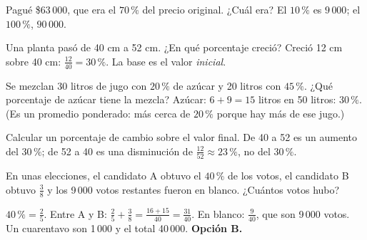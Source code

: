 \begin{ejemplo}
Pagué \$63\,000, que era el $70\,\%$ del precio original. ¿Cuál era?
\solucion El $10\,\%$ es $9\,000$; el $100\,\%$, $90\,000$.
\end{ejemplo}

\begin{ejemplo}
Una planta pasó de 40 cm a 52 cm. ¿En qué porcentaje creció?
\solucion Creció 12 cm sobre 40 cm: $\tfrac{12}{40} = 30\,\%$. La base es el valor \emph{inicial}.
\end{ejemplo}

\begin{ejemplo}
Se mezclan 30 litros de jugo con $20\,\%$ de azúcar y 20 litros con $45\,\%$. ¿Qué porcentaje de azúcar tiene la
mezcla?
\solucion Azúcar: $6 + 9 = 15$ litros en 50 litros: $30\,\%$. (Es un promedio ponderado: más cerca de $20\,\%$ porque
hay más de ese jugo.)
\end{ejemplo}

\begin{trampa}
Calcular un porcentaje de cambio sobre el valor final. De 40 a 52 es un aumento del $30\,\%$; de 52 a 40 es una
disminución de $\tfrac{12}{52} \approx 23\,\%$, no del $30\,\%$.
\end{trampa}

\begin{reto}
En unas elecciones, el candidato A obtuvo el $40\,\%$ de los votos, el candidato B obtuvo $\tfrac38$ y los 9\,000 votos
restantes fueron en blanco. ¿Cuántos votos hubo?
\end{reto}

\begin{retoresuelto}
$40\,\% = \tfrac25$. Entre A y B: $\tfrac25 + \tfrac38 = \tfrac{16 + 15}{40} = \tfrac{31}{40}$. En blanco: $\tfrac{9}{40}$,
que son 9\,000 votos. Un cuarentavo son 1\,000 y el total 40\,000. \textbf{Opción B.}
\end{retoresuelto}

